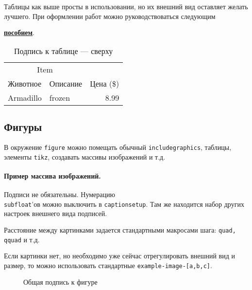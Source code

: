 Таблицы как выше просты в использовании, но их внешний вид оставляет желать лучшего. При оформлении работ можно руководствоваться следующим {\href{https://www.inf.ethz.ch/personal/markusp/teaching/guides/guide-tables.pdf}{\textbf{пособием}}.


\begin{table}[H]
    \centering
    \caption{\label{tab:widgets}Подпись к таблице --- сверху}
    \begin{tabular}{llr}
    	\toprule
    	          \multicolumn{2}{c}{Item}            &           \\
    	\cmidrule(r){1-2}
        Животное & Описание & Цена (\$) \\ \midrule
    	Armadillo                          & frozen   &      8.99 \\ \bottomrule
    \end{tabular}
\end{table}


\subsection{Фигуры}
В окружение \texttt{figure} можно помещать обычный \texttt{includegraphics}, таблицы, элементы \texttt{tikz}, создавать массивы изображений и т.д.

\paragraph{Пример массива изображений.}
Подписи не обязательны. Нумерацию \\ \texttt{subfloat}'ов можно выключить в \texttt{captionsetup}. Там же находится набор других настроек внешнего вида подписей.

Расстояние между картинками задается стандартными макросами шага: \texttt{quad, qquad} и т.д.

Если картинки нет, но необходимо уже сейчас отрегулировать внешний вид и размер, то можно использовать стандартные \texttt{example-image-[a,b,c]}.

\begin{figure}[H]
    \centering
    \captionsetup[subfigure]{justification=centering}
    \quad
    \quad
    \quad
    \caption{Общая подпись к фигуре}
\end{figure}

}
